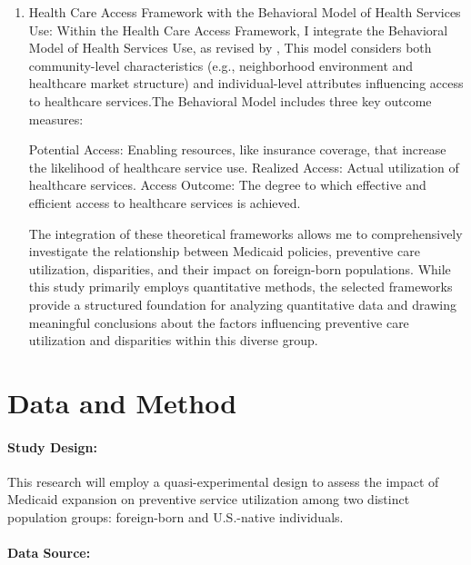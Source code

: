 \documentclass[man]{apa7}
\begin{document}
\begin{enumerate}

\item Health Care Access Framework with the Behavioral Model of Health Services Use: Within the Health Care Access Framework, I integrate the Behavioral Model of Health Services Use, as revised by \textcite{andersen_revisiting_1995}, This model considers both community-level characteristics (e.g., neighborhood environment and healthcare market structure) and individual-level attributes influencing access to healthcare services.The Behavioral Model includes three key outcome measures:

\subitem Potential Access: Enabling resources, like insurance coverage, that increase the likelihood of healthcare service use.
\subitem Realized Access: Actual utilization of healthcare services.
\subitem Access Outcome: The degree to which effective and efficient access to healthcare services is achieved.

The integration of these theoretical frameworks allows me to comprehensively investigate the relationship between Medicaid policies, preventive care utilization, disparities, and their impact on foreign-born populations. While this study primarily employs quantitative methods, the selected frameworks provide a structured foundation for analyzing quantitative data and drawing meaningful conclusions about the factors influencing preventive care utilization and disparities within this diverse group.

\end{enumerate}


\section{Data and Method}

\paragraph{Study Design:} This research will employ a quasi-experimental design to assess the impact of Medicaid expansion on preventive service utilization among two distinct population groups: foreign-born and U.S.-native individuals.

\paragraph{Data Source:} 
\end{document}

